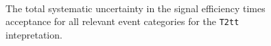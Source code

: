 \begin{figure}[h!]
  \begin{center}
    \\       
    \caption{\label{fig:sms-total-t2tt}The total systematic
      uncertainty in the signal efficiency times acceptance for all
      relevant event categories for the \texttt{T2tt} intepretation.}
  \end{center}
\end{figure}

